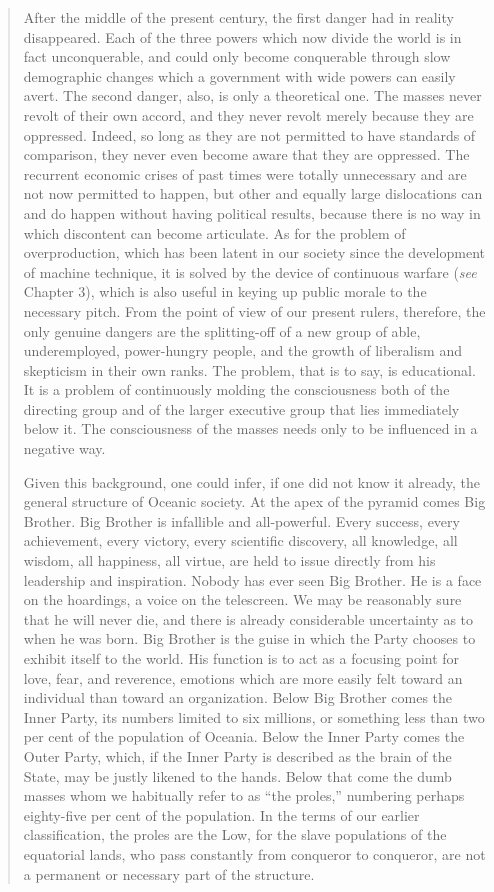 \begin{quotation}
After the middle of the present century, the first danger had in reality
disappeared. Each of the three powers which now divide the world is in
fact unconquerable, and could only become conquerable through slow
demographic changes which a government with wide powers can easily
avert. The second danger, also, is only a theoretical one. The masses
never revolt of their own accord, and they never revolt merely because
they are oppressed. Indeed, so long as they are not permitted to have
standards of comparison, they never even become aware that they are
oppressed. The recurrent economic crises of past times were totally
unnecessary and are not now permitted to happen, but other and equally
large dislocations can and do happen without having political results,
because there is no way in which discontent can become articulate. As
for the problem of overproduction, which has been latent in our society
since the development of machine technique, it is solved by the device
of continuous warfare (\emph{see} Chapter 3), which is also useful in
keying up public morale to the necessary pitch. From the point of view
of our present rulers, therefore, the only genuine dangers are the
splitting-off of a new group of able, underemployed, power-hungry
people, and the growth of liberalism and skepticism in their own ranks.
The problem, that is to say, is educational. It is a problem of
continuously molding the consciousness both of the directing group and
of the larger executive group that lies immediately below it. The
consciousness of the masses needs only to be influenced in a negative
way.

Given this background, one could infer, if one did not know it already,
the general structure of Oceanic society. At the apex of the pyramid
comes Big Brother. Big Brother is infallible and all-powerful. Every
success, every achievement, every victory, every scientific discovery,
all knowledge, all wisdom, all happiness, all virtue, are held to issue
directly from his leadership and inspiration. Nobody has ever seen Big
Brother. He is a face on the hoardings, a voice on the telescreen. We
may be reasonably sure that he will never die, and there is already
considerable uncertainty as to when he was born. Big Brother is the
guise in which the Party chooses to exhibit itself to the world. His
function is to act as a focusing point for love, fear, and reverence,
emotions which are more easily felt toward an individual than toward an
organization. Below Big Brother comes the Inner Party, its numbers
limited to six millions, or something less than two per cent of the
population of Oceania. Below the Inner Party comes the Outer Party,
which, if the Inner Party is described as the brain of the State, may be
justly likened to the hands. Below that come the dumb masses whom we
habitually refer to as ``the proles,'' numbering perhaps eighty-five per
cent of the population. In the terms of our earlier classification, the
proles are the Low, for the slave populations of the equatorial lands,
who pass constantly from conqueror to conqueror, are not a permanent or
necessary part of the structure.


\end{quotation}
